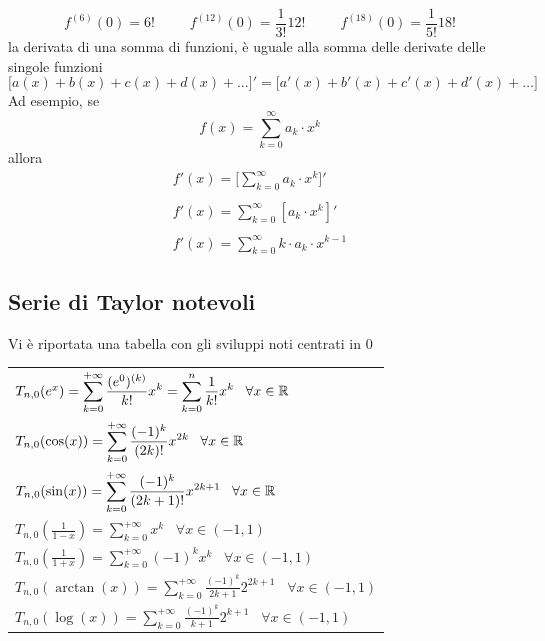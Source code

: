 \documentclass[10pt, letterpaper]{report}
\begin{document}
$$ f^{(6)}(0)=6!\;\;\;\;\;\;\;\;\; f^{(12)}(0)=\frac{1}{3!}12!
\;\;\;\;\;\;\;\;\; f^{(18)}(0)=\frac{1}{5!}18!$$
 la derivata di una somma di funzioni, è uguale alla somma delle 
derivate delle singole funzioni 
$$ \Big[a(x)+b(x)+c(x)+d(x)+\dots\Big]'=\Big[a'(x)+b'(x)+c'(x)+d'(x)+\dots\Big]$$
Ad esempio, se $$f(x)=\sum_{k=0}^\infty a_k\cdot x^k$$
allora 
$$\begin{matrix}\displaystyle f'(x)=\Big[\sum_{k=0}^\infty a_k\cdot x^k\Big]'\\ \\
    \displaystyle f'(x)=\sum_{k=0}^\infty [a_k\cdot x^k]'\\\\
    \displaystyle f'(x)=\sum_{k=0}^\infty k\cdot a_k\cdot x^{k-1}
\end{matrix}$$
\subsection{Serie di Taylor notevoli}
Vi è riportata una tabella con gli sviluppi noti centrati in $0$\begin{center}
    \begin{tabular}{l}
        \rowcolor[HTML]{FFFFC7} 
        $T_{n,0}(e^x)=\displaystyle \sum_{k=0}^{+\infty}\frac{(e^0)^{(k)}}{k!}x^k=\sum_{k=0}^n\frac{1}{k!}x^k\;\;\;\forall x \in {\mathbb R}$ \\
        \rowcolor[HTML]{EFEFEF} 
        $T_{n,0}(\cos(x)) = \displaystyle \sum_{k=0}^{+\infty}\frac{(-1)^k}{(2k)!}x^{2k}\;\;\;\forall x \in {\mathbb R}$ \\
        \rowcolor[HTML]{FFFFC7} 
        $T_{n,0}(\sin(x)) = \displaystyle \sum_{k=0}^{+\infty}\frac{(-1)^k}{(2k+1)!}x^{2k+1}\;\;\;\forall x \in {\mathbb R}$ \\
        \rowcolor[HTML]{EFEFEF} 
        $T_{n,0}(\frac{1}{1-x}) = \displaystyle \sum_{k=0}^{+\infty}x^k\;\;\;\forall x \in (-1,1)$ \\
        \rowcolor[HTML]{FFFFC7} 
        $T_{n,0}(\frac{1}{1+x}) = \displaystyle \sum_{k=0}^{+\infty}(-1)^kx^k\;\;\;\forall x \in (-1,1)$ \\
        \rowcolor[HTML]{EFEFEF} 
        $T_{n,0}(\arctan(x)) = \displaystyle \sum_{k=0}^{+\infty}\frac{(-1)^k}{2k+1}2^{2k+1}\;\;\;\forall x \in (-1,1)$ \\
        \rowcolor[HTML]{FFFFC7} 
        $T_{n,0}(\log(x)) = \displaystyle \sum_{k=0}^{+\infty}\frac{(-1)^k}{k+1}2^{k+1}\;\;\;\forall x \in (-1,1)$
        \end{tabular}
\end{center}
\flowerLine 
\end{document}
